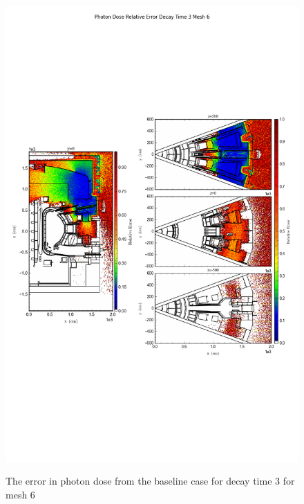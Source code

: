 \begin{figure}[ht!]
\centering
\includegraphics[trim={0cm 9cm 0cm 10cm},clip,scale=0.75]{../plots/final_model/Photon_Dose_Relative_Error_Decay_Time_3_Mesh_6.png}
\label{fig:photons_dc3_no4bc_m6_error}
\caption{The error in photon dose from the baseline case for decay time 3 for mesh 6}
\end{figure}

